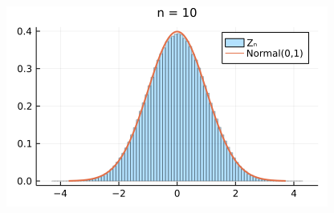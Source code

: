 \documentclass[
  letterpaper,
  DIV=11,
  numbers=noendperiod]{scrartcl}
\begin{document}
\begin{figure}[H]

{\centering \includegraphics{05 Central limit theorem_files/figure-pdf/cell-72-output-1.png}

}

\end{figure}
\end{document}

